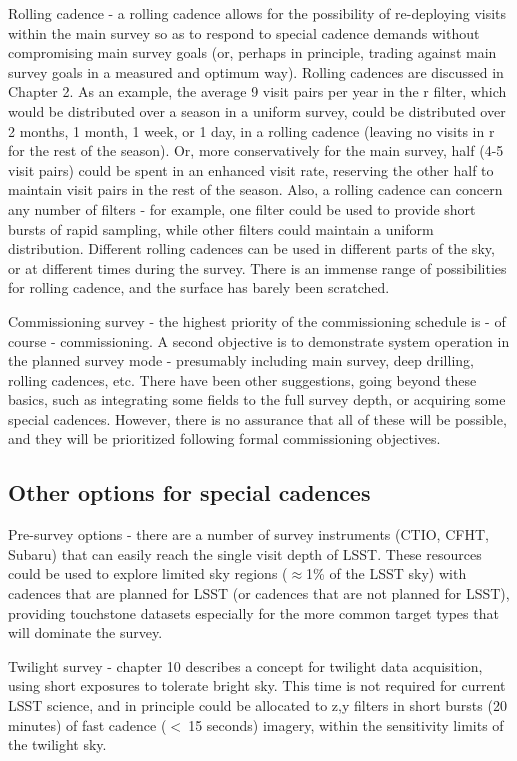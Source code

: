 Rolling cadence - a rolling cadence allows for the possibility of
re-deploying visits within the main survey so as to respond to special
cadence demands without compromising main survey goals (or, perhaps in
principle, trading against main survey goals in a measured and optimum
way). Rolling cadences are discussed in Chapter 2.  As an example, the
average 9 visit pairs per year in the r filter, which would be
distributed over a season in a uniform survey, could be distributed over
2 months, 1 month, 1 week, or 1 day, in a rolling cadence (leaving no
visits in r for the rest of the season).  Or, more conservatively for
the main survey, half (4-5 visit pairs) could be spent in an enhanced
visit rate, reserving the other half to maintain visit pairs in the rest
of the season.  Also, a rolling cadence can concern any number of
filters - for example, one filter could be used to provide short bursts
of rapid sampling, while other filters could maintain a uniform
distribution.  Different rolling cadences can be used in different parts
of the sky, or at different times during the survey.  There is an
immense range of possibilities for rolling cadence, and the surface has
barely been scratched.

Commissioning survey - the highest priority of the commissioning
schedule is - of course - commissioning.  A second objective is to
demonstrate system operation in the planned survey mode - presumably
including main survey, deep drilling, rolling cadences, etc.  There have
been other suggestions, going beyond these basics, such as
integrating some fields to the full survey depth, or acquiring some
special cadences.  However, there is no assurance that all of these will
be possible, and they will be prioritized following formal commissioning
objectives.

\subsection{Other options for special cadences}

Pre-survey options - there are a number of survey instruments (CTIO,
CFHT, Subaru) that can easily reach the single visit depth of LSST.
These resources could be used to explore limited sky regions
($\approx$1\% of the LSST sky) with cadences that are planned for LSST
(or cadences that are not planned for LSST), providing touchstone
datasets especially for the more common target types that will dominate
the survey.

Twilight survey - chapter 10 describes a concept for twilight data
acquisition, using short exposures to tolerate bright sky.  This time is
not required for current LSST science, and in principle could be
allocated to z,y filters in short bursts (20 minutes) of fast cadence
($<~$15 seconds) imagery, within the sensitivity limits of the twilight
sky.

